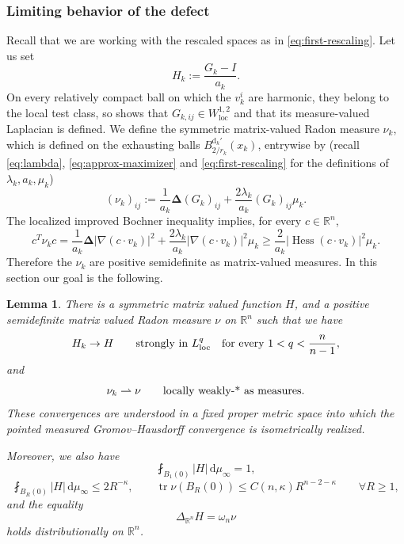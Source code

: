 \documentclass[12pt,a4paper,reqno]{amsart}
\newtheorem{lemma}[theorem]{Lemma}
\renewcommand{\leq}{\leqslant}
\renewcommand{\geq}{\geqslant}
\newcommand{\Hess}{\operatorname{Hess}}
\newcommand{\loc}{\mathrm{loc}}
\newcommand{\tr}{\operatorname{tr}}
\begin{document}
\subsubsection{Limiting behavior of the defect}
Recall that we are working with the rescaled spaces as in \eqref{eq:first-rescaling}. Let us set
\begin{equation}\label{eq:def-Hk}
 H_k:=\frac{G_k-I}{a_k}.
\end{equation}
On every relatively compact ball on which the $v_k^i$ are harmonic, they belong to the local test class, so 
\cite[Proposition~3.1.3]{GigliNDG} shows that
$G_{k,ij}\in W^{1,2}_{\loc}$ and that its measure-valued Laplacian is
defined. We define the symmetric matrix-valued Radon measure $\nu_k$, which is defined on the exhausting balls $B_{2/r_k}^{\mathrm{d}_k'}(x_k)$,
entrywise by (recall \eqref{eq:lambda}, \eqref{eq:approx-maximizer} and \eqref{eq:first-rescaling} for the definitions of $\lambda_k,a_k,\mu_k$)
\begin{equation}\label{eq:def-nuk}
 (\nu_k)_{ij}:=\frac{1}{a_k}\mathbf{\Delta}(G_k)_{ij}
       +\frac{2\lambda_k}{a_k} (G_k)_{ij}\mu_k.
\end{equation}
The {localized improved Bochner inequality
\cite[Proposition~2.14]{GigliViolo}}
implies, for every
$c\in\mathbb R^n$,
\begin{equation}\label{eq:polarised-Bochner}
 c^T\nu_k c
 =\frac{1}{a_k}\mathbf{\Delta}|\nabla(c\cdot v_k)|^2+\frac{2\lambda_k}{a_k}|\nabla(c\cdot v_k)|^2\mu_k
 \geq\frac{2}{a_k} |\Hess(c\cdot v_k)|^2\mu_k.
\end{equation}
Therefore the $\nu_k$ are positive semidefinite as
matrix-valued measures.  In this section our goal is the following. 
\begin{lemma}\label{lem:EstimatesH}
There is a symmetric matrix valued function $H$, and a positive semidefinite matrix valued Radon measure $\nu$ on $\mathbb{R}^n$ such that we have 
\begin{equation}\label{eq:H-strong-L1}
 H_k\to H
 \qquad\hbox{strongly in }L^q_{\loc}\quad\text{for every } 1< q<\frac{n}{n-1},
\end{equation}
and 
\begin{equation}\label{eq:nu-weak}
 \nu_k\rightharpoonup\nu
 \qquad\hbox{locally weakly-* as measures}.
\end{equation}
These convergences are understood in a fixed proper metric space
into which the pointed measured Gromov--Hausdorff convergence is
isometrically realized. 

Moreover, we also have 
\[
\fint_{B_1(0)}|H|\,\mathrm{d}\mu_\infty=1,
\]
\[
\fint_{B_R(0)}|H|\,\mathrm{d}\mu_\infty\leq 2R^{-\kappa}, \qquad \tr\nu(B_R(0))\leq C(n,\kappa)R^{n-2-\kappa}
 \qquad\forall R\geq1,
\]
and the equality 
\begin{equation}\label{eqn:LimitingLaplacian}
   \Delta_{\mathbb R^n}H=\omega_n\nu
\end{equation}
holds distributionally on $\mathbb R^n$.
\end{lemma}
\end{document}
